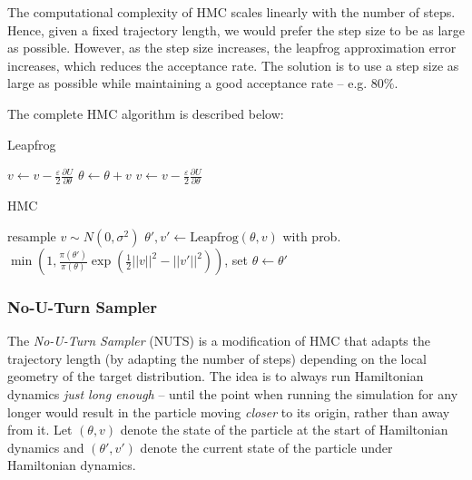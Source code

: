 \documentclass[12pt]{article}
\begin{document}
The computational complexity of HMC scales linearly with the number of steps. Hence, given a fixed trajectory length, we would prefer the step size to be as large as possible. However, as the step size increases, the leapfrog approximation error increases, which reduces the acceptance rate. The solution is to use a step size as large as possible while maintaining a good acceptance rate -- e.g. $80\%$. \cite{bnn_posterior}

The complete HMC algorithm is described below:
\begin{algorithm}
\caption{Leapfrog}
\label{alg_leapfrog}
\begin{algorithmic}
 
\State $v \gets v - \frac{\varepsilon}{2} \frac{\partial U}{\partial \theta}$ 
\State $\theta \gets \theta + v$ 
\State $v \gets v - \frac{\varepsilon}{2} \frac{\partial U}{\partial \theta}$ 
\EndFor
\end{algorithmic}
\end{algorithm}

\begin{algorithm}
\caption{HMC}
\label{alg_hmc}
\begin{algorithmic}
 
	\State resample $v \sim N(0, \sigma^2)$ 
	\State $\theta', v' \gets \textrm{Leapfrog}(\theta, v)$ 
	\State with prob. $\min{\left(1, \frac{\pi(\theta')}{\pi(\theta)} \exp \left( \frac{1}{2}||v||^2 - ||v'||^2 \right) \right)}$, set $\theta \gets \theta'$ 
\EndFor
\end{algorithmic}
\end{algorithm}

\subsubsection{No-U-Turn Sampler}

The \textit{No-U-Turn Sampler} (NUTS) is a modification of HMC that adapts the trajectory length (by adapting the number of steps) depending on the local geometry of the target distribution. \cite{nuts} The idea is to always run Hamiltonian dynamics \textit{just long enough} -- until the point when running the simulation for any longer would result in the particle moving \textit{closer} to its origin, rather than away from it. Let $(\theta, v)$ denote the state of the particle at the start of Hamiltonian dynamics and $(\theta', v')$ denote the current state of the particle under Hamiltonian dynamics.
\end{document}
